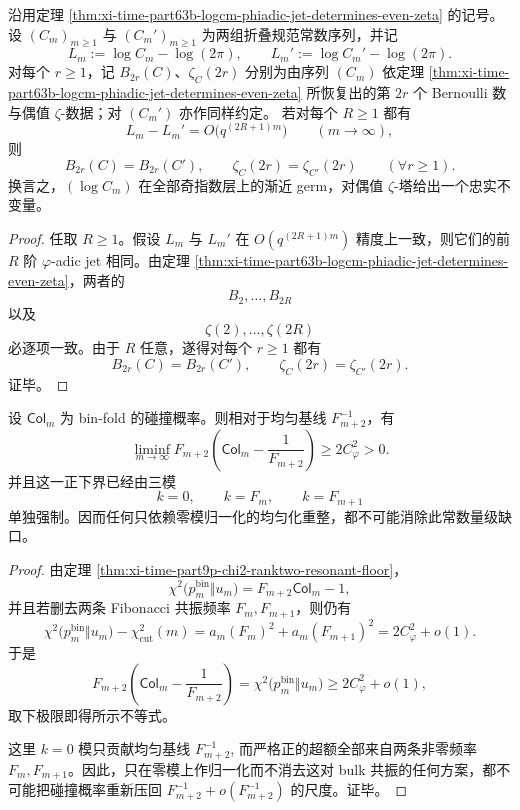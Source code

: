 \begin{corollary}\label{cor:xi-time-part63b-logcm-asymptotic-germ-faithful-even-zeta}
沿用定理 \ref{thm:xi-time-part63b-logcm-phiadic-jet-determines-even-zeta} 的记号。设 \((C_m)_{m\ge 1}\) 与 \((C_m')_{m\ge 1}\) 为两组折叠规范常数序列，并记
\[
L_m:=\log C_m-\log(2\pi),
\qquad
L_m':=\log C_m'-\log(2\pi).
\]
对每个 \(r\ge 1\)，记 \(B_{2r}(C)\)、\(\zeta_C(2r)\) 分别为由序列 \((C_m)\) 依定理 \ref{thm:xi-time-part63b-logcm-phiadic-jet-determines-even-zeta} 所恢复出的第 \(2r\) 个 Bernoulli 数与偶值 \(\zeta\)-数据；对 \((C_m')\) 亦作同样约定。
若对每个 \(R\ge 1\) 都有
\[
L_m-L_m'
=
O\!\bigl(q^{(2R+1)m}\bigr)
\qquad(m\to\infty),
\]
则
\[
B_{2r}(C)=B_{2r}(C'),
\qquad
\zeta_C(2r)=\zeta_{C'}(2r)
\qquad(\forall r\ge 1).
\]
换言之，\((\log C_m)\) 在全部奇指数层上的渐近 germ，对偶值 \(\zeta\)-塔给出一个忠实不变量。
\end{corollary}
\begin{proof}
任取 \(R\ge 1\)。假设 \(L_m\) 与 \(L_m'\) 在 \(O(q^{(2R+1)m})\) 精度上一致，则它们的前 \(R\) 阶 \(\varphi\)-adic jet 相同。由定理 \ref{thm:xi-time-part63b-logcm-phiadic-jet-determines-even-zeta}，两者的
\[
B_2,\dots,B_{2R}
\]
以及
\[
\zeta(2),\dots,\zeta(2R)
\]
必逐项一致。由于 \(R\) 任意，遂得对每个 \(r\ge 1\) 都有
\[
B_{2r}(C)=B_{2r}(C'),
\qquad
\zeta_C(2r)=\zeta_{C'}(2r).
\]
证毕。
\end{proof}

\begin{theorem}[三模不可去缺口与零模不可重整化]\label{thm:xi-time-part63b-three-mode-gap-zero-mode-nonrenormalizable}
设 \(\mathsf{Col}_m\) 为 bin-fold 的碰撞概率。则相对于均匀基线 \(F_{m+2}^{-1}\)，有
\[
\liminf_{m\to\infty}
F_{m+2}\left(\mathsf{Col}_m-\frac{1}{F_{m+2}}\right)
\ge
2C_\varphi^2
>
0.
\]
并且这一正下界已经由三模
\[
k=0,\qquad k=F_m,\qquad k=F_{m+1}
\]
单独强制。因而任何只依赖零模归一化的均匀化重整，都不可能消除此常数量级缺口。
\end{theorem}
\begin{proof}
由定理 \ref{thm:xi-time-part9p-chi2-ranktwo-resonant-floor}，
\[
\chi^2\!\bigl(p_m^{\mathrm{bin}}\Vert u_m\bigr)
=
F_{m+2}\mathsf{Col}_m-1,
\]
并且若删去两条 Fibonacci 共振频率 \(F_m,F_{m+1}\)，则仍有
\[
\chi^2\!\bigl(p_m^{\mathrm{bin}}\Vert u_m\bigr)-\chi^2_{\mathrm{cut}}(m)
=
a_m(F_m)^2+a_m(F_{m+1})^2
=
2C_\varphi^2+o(1).
\]
于是
\[
F_{m+2}\left(\mathsf{Col}_m-\frac{1}{F_{m+2}}\right)
=
\chi^2\!\bigl(p_m^{\mathrm{bin}}\Vert u_m\bigr)
\ge
2C_\varphi^2+o(1),
\]
取下极限即得所示不等式。

这里 \(k=0\) 模只贡献均匀基线
\(
F_{m+2}^{-1}
\),
而严格正的超额全部来自两条非零频率 \(F_m,F_{m+1}\)。因此，只在零模上作归一化而不消去这对 bulk 共振的任何方案，都不可能把碰撞概率重新压回
\(
F_{m+2}^{-1}+o(F_{m+2}^{-1})
\)
的尺度。证毕。
\end{proof}

